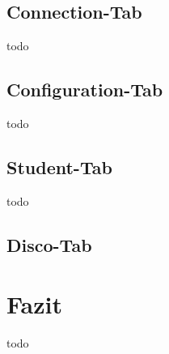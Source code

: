 
\subsection{Connection-Tab}
todo
\subsection{Configuration-Tab}
todo
\subsection{Student-Tab}
todo
\subsection{Disco-Tab}

\section{Fazit}
todo

